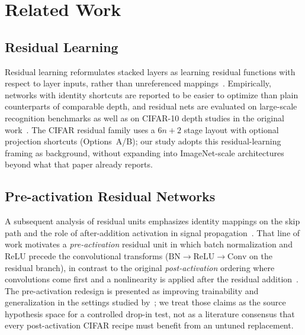 \section{Related Work}
\label{sec:related}


\subsection{Residual Learning}
\label{sec:rw-residual}

Residual learning reformulates stacked layers as learning residual functions with respect
to layer inputs, rather than unreferenced mappings~\citep{He2016DeepResidual}.
Empirically, networks with identity shortcuts are reported to be easier to optimize than
plain counterparts of comparable depth, and residual nets are evaluated on large-scale
recognition benchmarks as well as on CIFAR-10 depth studies in the original
work~\citep{He2016DeepResidual}.
The CIFAR residual family uses a $6n{+}2$ stage layout with optional projection shortcuts
(Options~A/B); our study adopts this residual-learning framing as background, without
expanding into ImageNet-scale architectures beyond what that paper already reports.

\subsection{Pre-activation Residual Networks}
\label{sec:rw-preact}

A subsequent analysis of residual units emphasizes identity mappings on the skip path and
the role of after-addition activation in signal propagation~\citep{He2016IdentityMappings}.
That line of work motivates a \emph{pre-activation} residual unit in which batch
normalization and ReLU precede the convolutional transforms
($\mathrm{BN}{\rightarrow}\mathrm{ReLU}{\rightarrow}\mathrm{Conv}$ on the residual branch),
in contrast to the original \emph{post-activation} ordering where convolutions come first and
a nonlinearity is applied after the residual addition~\citep{He2016DeepResidual,He2016IdentityMappings}.
The pre-activation redesign is presented as improving trainability and generalization in the
settings studied by~\citet{He2016IdentityMappings}; we treat those claims as the source
hypothesis space for a controlled drop-in test, not as a literature consensus that every
post-activation CIFAR recipe must benefit from an untuned replacement.

